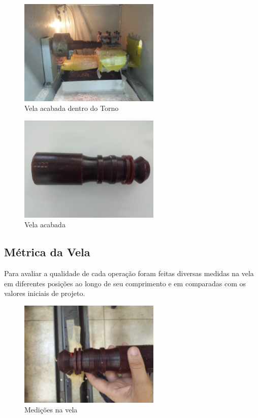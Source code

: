 \documentclass[a4paper,11pt]{article}
\begin{document}
\begin{figure}[H]
    \centering
    \includegraphics[width = 0.6\textwidth]{./img/relat1/vela-torno}
    \caption{Vela acabada dentro do Torno}
    \label{fig:vela_tornoCNC}
\end{figure}

\begin{figure}[H]
    \centering
    \includegraphics[width = 0.6\textwidth]{./img/relat1/vela-detalhe}
    \caption{Vela acabada}
    \label{fig:vela_final}
\end{figure}


\subsection{Métrica da Vela}
Para avaliar a qualidade de cada operação foram feitas diversas medidas na vela em diferentes posições ao longo de seu comprimento e em comparadas com os valores iniciais de projeto.

\begin{figure}[H]
    \centering
    \includegraphics[width = 0.6\textwidth]{./img/relat1/vela-medidas}
    \caption{Medições na vela}
    \label{fig:vela_medidas}
\end{figure}
\end{document}

